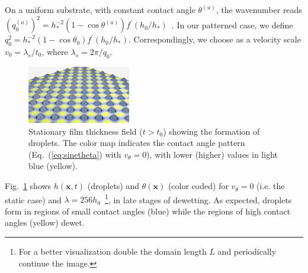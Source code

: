 \documentclass[amsmath,amssymb,showpacs,prf,superscriptaddress, longbibliography]{revtex4-1} %
\begin{document}
On a uniform substrate, with constant contact angle $\theta^{(u)}$, the wavenumber reads $(q^{(u)}_0)^2 = h_{\ast}^{-2}(1-\cos \theta^{(u)})f^{\prime}(h_0/h_{\ast})$~\cite{meckeThermalFluctuationsThin2005, zhangMolecularSimulationThin2019}. 
In our patterned case, we define 
  $q_0^2=h_{\ast}^{-2}(1-\cos\theta_0)f^{\prime}(h_0/h_{\ast})$. Correspondingly, we choose as a velocity scale $v_0 = \lambda_s/t_0$, where
$\lambda_s = 2\pi/q_0$.
\begin{figure}
    \centering
    \includegraphics[width=0.4\textwidth]{Figure_1.png}
    \caption{Stationary film thickness field ($t>t_0$) showing the formation of droplets. The color map indicates the contact angle pattern 
    (Eq.~(\ref{eq:sinetheta}) with $v_{\theta}=0$), with lower (higher) values in light blue (yellow).
    }
    \label{fig:handtheta}
\end{figure}
Fig.~\ref{fig:handtheta} shows $h(\mathbf{x},t)$ (droplets) and $\theta(\mathbf{x})$ (color coded) for $v_{\theta} = 0$ (i.e. the static case) and $\lambda = 256 h_0$~\footnote{For a better visualization double the domain length $L$ and periodically continue the image.}, in late stages of dewetting.
As expected, droplets form in regions of small contact angles (blue) while the regions of high contact angles (yellow) dewet.
\end{document}
